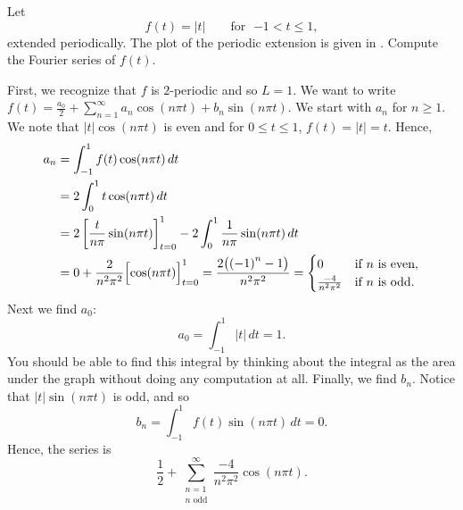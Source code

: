 \begin{example}
Let
\begin{equation*}
f(t) =
\lvert t \rvert
\qquad \text{for } \; {-1} < t \leq 1,
\end{equation*}
extended periodically.  The plot of the
periodic extension is given in .
Compute the Fourier series of $f(t)$.

\begin{myfig}
\capstart
{}
\caption{Periodic extension of the function $f(t)$.\label{gfs:sawcontfig}}
\end{myfig}

First, we recognize that $f$ is $2$-periodic and so $L=1$.
We want to
write $f(t) = \frac{a_0}{2} + \sum_{n=1}^\infty a_n \cos (n \pi t) + b_n
\sin (n \pi t)$.  We start with $a_n$ for $n \geq 1$.
We note that $\lvert t \rvert \cos (n \pi t)$
is even and for $0 \leq t \leq 1$, $f(t) = \lvert t \rvert = t$.  Hence,
\begin{equation*}
\begin{split}
a_n & = \int_{-1}^1 f(t) \cos (n \pi t) \, dt \\
& = 2 \int_{0}^1 t \cos (n \pi t) \, dt \\
 & = 2 \left[ \frac{t}{n \pi} \sin (n \pi t) \right]_{t=0}^1 -
2 \int_{0}^1 \frac{1}{n \pi} \sin (n \pi t) \, dt \\
& =  0 + \frac{2}{n^2 \pi^2} \Bigl[ \cos (n \pi t) \Bigr]_{t=0}^1
 =  \frac{2 \bigl( {(-1)}^n -1 \bigr) }{n^2 \pi^2}
=
\begin{cases}
0 & \text{if } n \text{ is even} , \\
\frac{-4 }{n^2 \pi^2} & \text{if } n \text{ is odd}  .
\end{cases}
\end{split}
\end{equation*}
Next we find $a_0$:
\begin{equation*}
a_0 = \int_{-1}^1 \lvert t \rvert \, dt 
=
1 .
\end{equation*}
You should be able to find this integral by thinking about the integral
as the area under the graph without doing any computation at all.
Finally, we find $b_n$.  Notice that
$\lvert t \rvert \sin (n \pi t)$ is odd, and so
\begin{equation*}
b_n = \int_{-1}^1 f(t) \sin (n \pi t) \, dt = 0 .
\end{equation*}
Hence,
the series is 
\begin{equation*}
\frac{1}{2} + 
\sum_{\substack{n=1 \\ n \text{ odd}}}^\infty \frac{-4}{n^2 \pi^2} \cos (n \pi t) .
\end{equation*}


\end{example}
